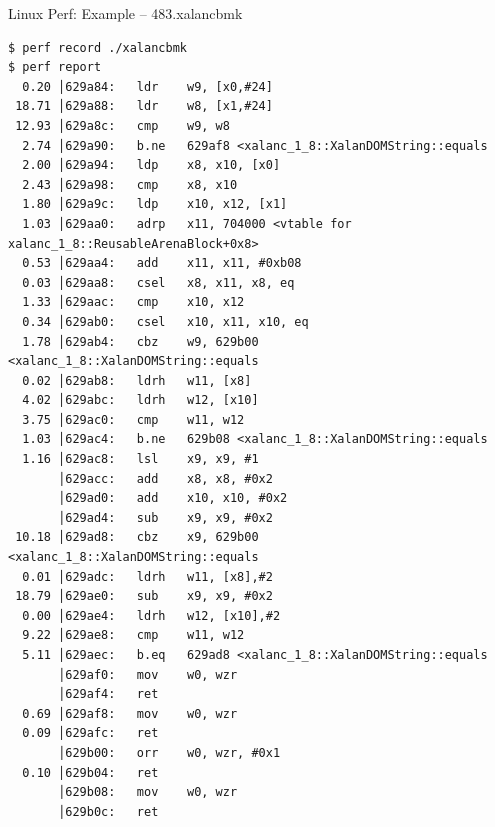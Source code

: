 \documentclass{beamer}
\begin{document}
\begin{frame}[fragile]{Linux Perf: Example -- 483.xalancbmk}
  \begin{lrbox}{\myv}
    \begin{minipage}{\textwidth}
\begin{verbatim}
$ perf record ./xalancbmk
$ perf report
  0.20 │629a84:   ldr    w9, [x0,#24]
 18.71 │629a88:   ldr    w8, [x1,#24]
 12.93 │629a8c:   cmp    w9, w8
  2.74 │629a90:   b.ne   629af8 <xalanc_1_8::XalanDOMString::equals
  2.00 │629a94:   ldp    x8, x10, [x0]
  2.43 │629a98:   cmp    x8, x10
  1.80 │629a9c:   ldp    x10, x12, [x1]
  1.03 │629aa0:   adrp   x11, 704000 <vtable for xalanc_1_8::ReusableArenaBlock+0x8>
  0.53 │629aa4:   add    x11, x11, #0xb08
  0.03 │629aa8:   csel   x8, x11, x8, eq
  1.33 │629aac:   cmp    x10, x12
  0.34 │629ab0:   csel   x10, x11, x10, eq
  1.78 │629ab4:   cbz    w9, 629b00 <xalanc_1_8::XalanDOMString::equals
  0.02 │629ab8:   ldrh   w11, [x8]
  4.02 │629abc:   ldrh   w12, [x10]
  3.75 │629ac0:   cmp    w11, w12
  1.03 │629ac4:   b.ne   629b08 <xalanc_1_8::XalanDOMString::equals
  1.16 │629ac8:   lsl    x9, x9, #1
       │629acc:   add    x8, x8, #0x2
       │629ad0:   add    x10, x10, #0x2
       │629ad4:   sub    x9, x9, #0x2
 10.18 │629ad8:   cbz    x9, 629b00 <xalanc_1_8::XalanDOMString::equals
  0.01 │629adc:   ldrh   w11, [x8],#2
 18.79 │629ae0:   sub    x9, x9, #0x2
  0.00 │629ae4:   ldrh   w12, [x10],#2
  9.22 │629ae8:   cmp    w11, w12
  5.11 │629aec:   b.eq   629ad8 <xalanc_1_8::XalanDOMString::equals
       │629af0:   mov    w0, wzr
       │629af4:   ret
  0.69 │629af8:   mov    w0, wzr
  0.09 │629afc:   ret
       │629b00:   orr    w0, wzr, #0x1
  0.10 │629b04:   ret
       │629b08:   mov    w0, wzr
       │629b0c:   ret
\end{verbatim}
    \end{minipage}
  \end{lrbox}
  \resizebox{0.5\textwidth}{!}{\usebox\myv}
\end{frame}
\end{document}
